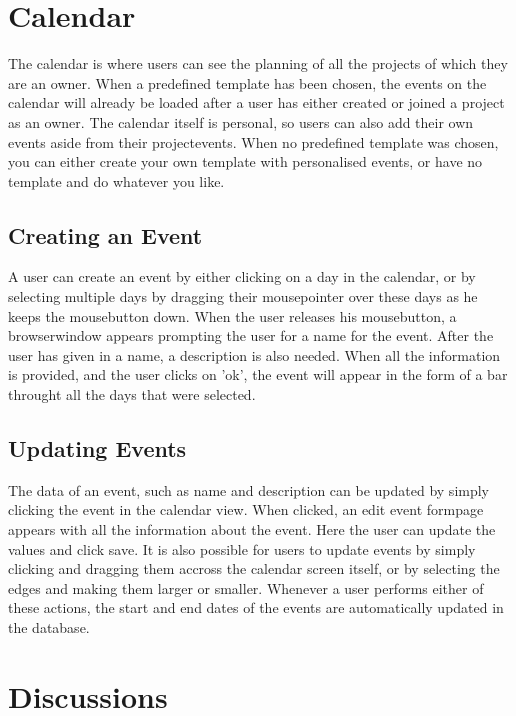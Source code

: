 \section{Calendar}

The calendar is where users can see the planning of all the projects of which they are an owner.
When a predefined template has been chosen, the events on the calendar will already be loaded after
a user has either created or joined a project as an owner. The calendar itself is personal, so users can also add their own events aside from their projectevents. When no predefined template was chosen, you can either
create your own template with personalised events, or have no template and do whatever you like.

\subsection{Creating an Event}

A user can create an event by either clicking on a day in the calendar, or by selecting multiple days by dragging their mousepointer over these days
as he keeps the mousebutton down. When the user releases his mousebutton, a browserwindow appears prompting the user for a name for the event. After
the user has given in a name, a description is also needed. When all the information is provided, and the user clicks on 'ok', the event will appear
in the form of a bar throught all the days that were selected.

\subsection{Updating Events}

The data of an event, such as name and description can be updated by simply clicking the event in the calendar view. When clicked, an edit event 
formpage appears with all the information about the event. Here the user can update the values and click save. It is also possible for users
to update events by simply clicking and dragging them accross the calendar screen itself, or by selecting the edges and making them larger or
smaller. Whenever a user performs either of these actions, the start and end dates of the events are automatically updated in the database.

\section{Discussions}

